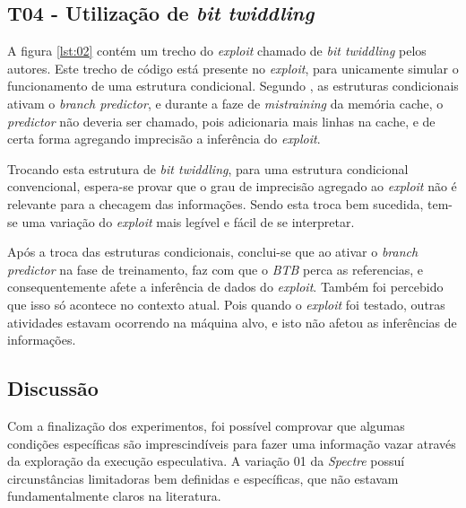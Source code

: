 \documentclass[
	article,			    %
	12pt,				    %
	oneside,			    %
	a4paper,			    %
	chapter=TITLE,		    %
	section=TITLE,		    %
	subsection=TITLE,	    %
	english,			    %
	brazil,				    %
	sumario=tradicional
]{abntex2}
\begin{document}
\begin{comment}
Adicionar uma imagem com as saídas.
Retirar a parte dos benchmarks, pois pode conter erros grotescos, por causa da lei dos grandes números.
\end{comment}

\subsection{T04 - Utilização de \emph{bit twiddling}}
A figura \ref{lst:02} contém um trecho do \emph{exploit} chamado de \emph{bit twiddling} pelos autores. Este trecho de código está presente no \emph{exploit}, para unicamente simular o funcionamento de uma estrutura condicional. Segundo , as estruturas condicionais ativam o \emph{branch predictor}, e durante a faze de \emph{mistraining} da memória cache, o \emph{predictor} não deveria ser chamado, pois adicionaria mais linhas na cache, e de certa forma agregando imprecisão a inferência do \emph{exploit}.



Trocando esta estrutura de \emph{bit twiddling}, para uma estrutura condicional convencional, espera-se provar que o grau de imprecisão agregado ao \emph{exploit} não é relevante para a checagem das informações. Sendo esta troca bem sucedida, tem-se uma variação do \emph{exploit} mais legível e fácil de se interpretar.

Após a troca das estruturas condicionais, conclui-se que ao ativar o \emph{branch predictor} na fase de treinamento, faz com que o \emph{BTB} perca as referencias, e consequentemente afete a inferência de dados do \emph{exploit}. Também foi percebido que isso só acontece no contexto atual. Pois quando o \emph{exploit} foi testado, outras atividades estavam ocorrendo na máquina alvo, e isto não afetou as inferências de informações.

\subsection{Discussão}
Com a finalização dos experimentos, foi possível comprovar que algumas condições específicas são imprescindíveis para fazer uma informação vazar através da exploração da execução especulativa. A variação 01 da \emph{Spectre} possuí circunstâncias limitadoras bem definidas e específicas, que não estavam fundamentalmente claros na literatura.
\end{document}
